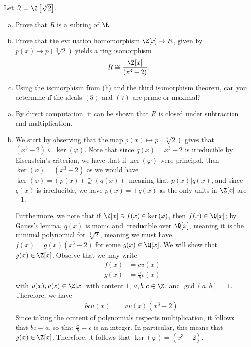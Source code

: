 \documentclass[10pt]{mypackage}
\begin{document}
\begin{problem}[Problem 2]
  Let $R = \Z\left[ \sqrt[3]{2} \right]$.
  \begin{enumerate}[(a)]
    \item Prove that $R$ is a subring of $\R$.
    \item Prove that the evaluation homomorphism $\Z[x]\rightarrow R$, given by $p(x) \mapsto p\left( \sqrt[3]{2} \right)$ yields a ring isomorphism
      \begin{align*}
        R &\cong \frac{\Z[x]}{\left( x^3-2 \right)}.
      \end{align*}
    \item Using the isomorphism from (b) and the third isomorphism theorem, can you determine if the ideals $\left( 5 \right)$ and $\left( 7 \right)$ are prime or maximal?
  \end{enumerate}
\end{problem}
\begin{solution}\hfill
  \begin{enumerate}[(a)]
    \item By direct computation, it can be shown that $R$ is closed under subtraction and multiplication.
    \item We start by observing that the map $p(x)\mapsto p\left( \sqrt[3]{2} \right)$ gives that $\left( x^3-2 \right)\subseteq \ker\left( \varphi \right)$. Note that since $q(x) = x^3-2$ is irreducible by Eisenstein's criterion, we have that if $\ker\left( \varphi \right)$ were principal, then $\ker\left( \varphi \right) = \left( x^3-2 \right)$ as we would have $\ker\left( \varphi \right) = \left( p(x) \right) \supseteq \left( q(x) \right)$, meaning that $p(x) | q(x)$, and since $q(x)$ is irreducible, we have $p(x) = \pm q(x)$ as the only units in $\Z[x]$ are $\pm 1$.

      Furthermore, we note that if $\Z[x]\ni f(x)\in \ker\left( \varphi \right)$, then $f(x)\in \Q[x]$; by Gauss's lemma, $q(x)$ is monic and irreducible over $\Q[x]$, meaning it is the minimal polynomial for $\sqrt[3]{2}$, meaning we must have $f(x) = g(x)\left( x^3-2 \right)$ for some $g(x)\in \Q[x]$. We will show that $g(x)\in \Z[x]$. Observe that we may write
      \begin{align*}
        f(x) &= c u(x)\\
        g(x) &= \frac{a}{b} v(x)
      \end{align*}
      with $u(x),v(x)\in \Z[x]$ with content $1$, $a,b,c\in \Z$, and $\gcd\left( a,b \right) = 1$. Therefore, we have
      \begin{align*}
        bcu(x) &= av(x)\left( x^3-2 \right).
      \end{align*}
      Since taking the content of polynomials respects multiplication, it follows that $bc = a$, so that $\frac{a}{b} = c$ is an integer. In particular, this means that $g(x)\in \Z[x]$. Therefore, it follows that $\ker\left( \varphi \right) = \left( x^3-2 \right)$.
  \end{enumerate}
\end{solution}
\end{document}

